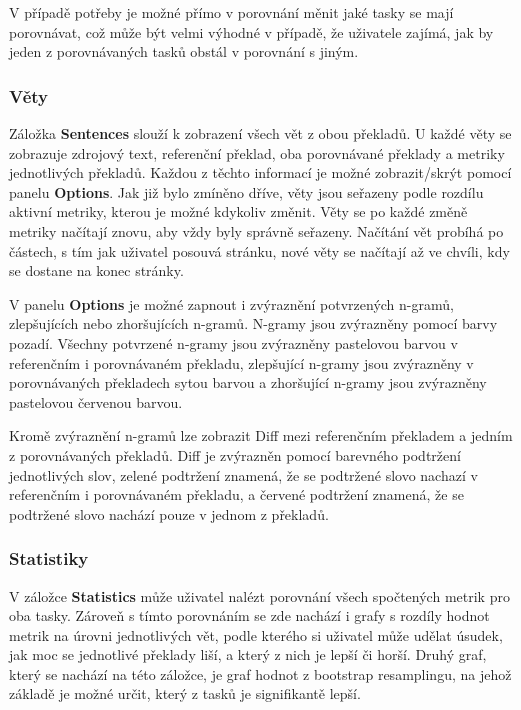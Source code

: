 V případě potřeby je možné přímo v porovnání měnit jaké tasky se mají porovnávat,
  což může být velmi výhodné v případě,
  že uživatele zajímá,
  jak by jeden z porovnávaných tasků obstál v porovnání s jiným.

\subsubsection{Věty}
Záložka \textbf{Sentences} slouží k zobrazení všech vět z obou překladů.
U každé věty se zobrazuje zdrojový text,
  referenční překlad, oba porovnávané překlady
  a metriky jednotlivých překladů.
Každou z těchto informací je možné zobrazit/skrýt pomocí panelu \textbf{Options}.
Jak již bylo zmíněno dříve,
  věty jsou seřazeny podle rozdílu aktivní metriky,
  kterou je možné kdykoliv změnit.
Věty se po každé změně metriky načítají znovu,
  aby vždy byly správně seřazeny.
Načítání vět probíhá po částech,
  s tím jak uživatel posouvá stránku,
  nové věty se načítají až ve chvíli,
  kdy se dostane na konec stránky.

V panelu \textbf{Options} je možné zapnout i zvýraznění potvrzených n-gramů, zlepšujících nebo zhoršujících n-gramů.
N-gramy jsou zvýrazněny pomocí barvy pozadí.
Všechny potvrzené n-gramy jsou zvýrazněny pastelovou barvou v referenčním i porovnávaném překladu,
  zlepšující n-gramy jsou zvýrazněny v porovnávaných překladech sytou barvou
  a zhoršující n-gramy jsou zvýrazněny pastelovou červenou barvou.

Kromě zvýraznění n-gramů lze zobrazit Diff mezi referenčním překladem a jedním z porovnávaných překladů.
Diff je zvýrazněn pomocí barevného podtržení jednotlivých slov,
  zelené podtržení znamená, že se podtržené slovo nachazí v referenčním i porovnávaném překladu,
  a červené podtržení znamená, že se podtržené slovo nachází pouze v jednom z překladů.

\subsubsection{Statistiky}
V záložce \textbf{Statistics} může uživatel nalézt porovnání všech spočtených metrik pro oba tasky.
Zároveň s tímto porovnáním se zde nachází i grafy s rozdíly hodnot metrik na úrovni jednotlivých vět,
  podle kterého si uživatel může udělat úsudek,
  jak moc se jednotlivé překlady liší,
  a který z nich je lepší či horší.
Druhý graf, který se nachází na této záložce,
  je graf hodnot z bootstrap resamplingu,
  na jehož základě je možné určit,
  který z tasků je signifikantě lepší.


